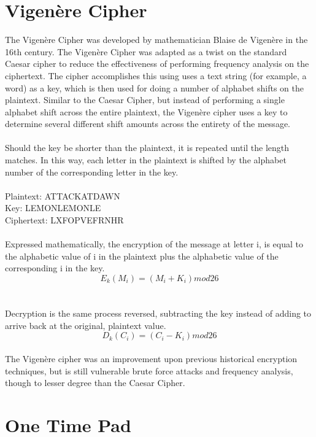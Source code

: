 \documentclass[11pt]{article}
\begin{document}
\section{Vigenère Cipher}

The Vigenère Cipher was developed by mathematician Blaise de Vigenère in the 16th century. The Vigenère Cipher was adapted as a twist on the standard Caesar cipher to reduce the effectiveness of performing frequency analysis on the ciphertext. The cipher accomplishes this using uses a text string (for example, a word) as a key, which is then used for doing a number of alphabet shifts on the plaintext. Similar to the Caesar Cipher, but instead of performing a single alphabet shift across the entire plaintext, the Vigenère cipher uses a key to determine several different shift amounts across the entirety of the message.
\\
\\
Should the key be shorter than the plaintext, it is repeated until the length matches. In this way, each letter in the plaintext is shifted by the alphabet number of the corresponding letter in the key.
\\
\\
Plaintext:  ATTACKATDAWN\\
Key:        LEMONLEMONLE\\
Ciphertext: LXFOPVEFRNHR
\\
\\
Expressed mathematically, the encryption of the message at letter i, is equal to the alphabetic value of i in the plaintext plus the alphabetic value of the corresponding i in the key.
$$E_k(M_i)=(M_i+K_i)mod26$$
\\
\\
Decryption is the same process reversed, subtracting the key instead of adding to arrive back at the original, plaintext value.
\\
$$D_k(C_i)=(C_i-K_i)mod26$$
\\
The Vigenère cipher was an improvement upon previous historical encryption techniques, but is still vulnerable brute force attacks and frequency analysis, though to lesser degree than the Caesar Cipher.
\\

\section{One Time Pad}
\end{document}
